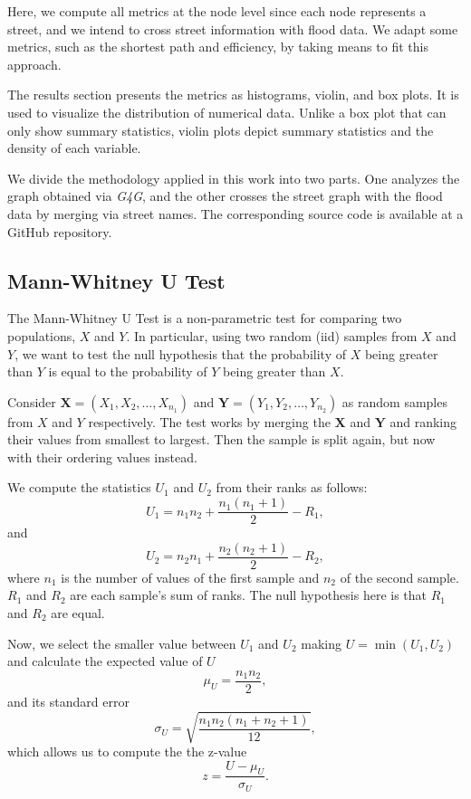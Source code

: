 \documentclass[sn-nature]{sn-jnl}%
\theoremstyle{thmstyleone}%
\theoremstyle{thmstyletwo}%
\theoremstyle{thmstylethree}%
\begin{document}
Here, we compute all metrics at the node level since each node represents a street, and we intend to cross street information with flood data. We adapt some metrics, such as the shortest path and efficiency, by taking means to fit this approach.

The results section presents the metrics as histograms, violin, and box plots.
It is used to visualize the distribution of numerical data. Unlike a box plot that can only show summary statistics, violin plots depict summary statistics and the density of each variable.

We divide the methodology applied in this work into two parts. One analyzes the graph obtained via \textit{G4G}, and the other crosses the street graph with the flood data by merging via street names. The corresponding source code is available at a GitHub repository.

\subsection{Mann-Whitney U Test}

The Mann-Whitney U Test is a non-parametric test for comparing two populations, $X$ and $Y$.
In particular, using two random (iid) samples from $X$ and $Y$, we want to test the null hypothesis that the probability of $X$ being greater than $Y$ is equal to the probability of $Y$ being greater than $X$.

Consider $\boldsymbol{X} = (X_1, X_2, \ldots, X_{n_1})$ and $\boldsymbol{Y} = (Y_1, Y_2, \ldots, Y_{n_2})$ as random samples from $X$ and $Y$ respectively.
The test works by merging the $\boldsymbol{X}$ and $\boldsymbol{Y}$ and ranking their values from smallest to largest.
Then the sample is split again, but now with their ordering values instead.

We compute the statistics $U_1$ and $U_2$ from their ranks as follows:
\begin{equation}
U_1 = n_1 n_2  + \frac{n_1(n_1+1)}{2} - R_1,
\end{equation}
and
\begin{equation}
    U_2 = n_2 n_1  + \frac{n_2(n_2+1)}{2} - R_2,
\end{equation}
where $n_1$ is the number of values of the first sample and $n_2$ of the second sample. $R_1$ and $R_2$ are each sample's sum of ranks.
The null hypothesis here is that $R_1$ and $R_2$ are equal.

Now, we select the smaller value between $U_1$ and $U_2$ making $U = \min(U_1, U_2)$ and calculate the expected value of $U$
\begin{equation}
    \mu_U = \frac{n_1n_2}{2},
\end{equation}
and its  standard error
\begin{equation}
    \sigma_U = \sqrt{\frac{n_1n_2(n_1+n_2+1)}{12}},
\end{equation}
which allows us to compute the the z-value
\begin{equation}
    z = \frac{U - \mu_U}{\sigma_U}.
\end{equation}
\end{document}
